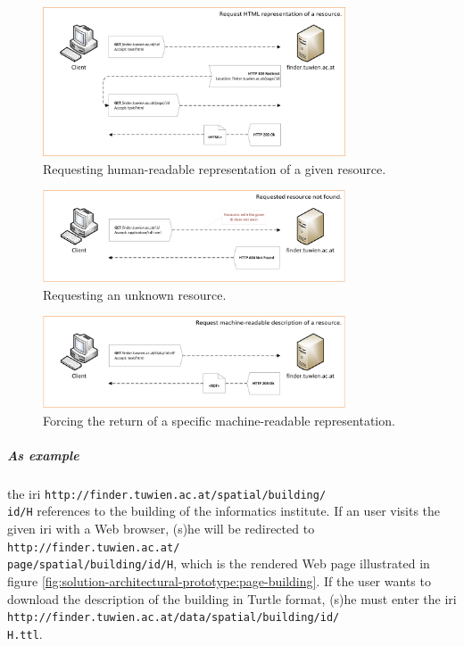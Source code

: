 \documentclass[draft,final]{vutinfth} %
\begin{document}
\begin{figure}[h]
    \centering
    \includegraphics[width=0.8\textwidth]{graphics/solution/uri-strategy/uriStrategyHumanReadable.png}
    \caption{Requesting human-readable representation of a given resource.}
    \label{fig:solution-architectural-prototype:ld-publishing:human-readable}
\end{figure}

\begin{figure}[h]
    \centering
    \includegraphics[width=0.8\textwidth]{graphics/solution/uri-strategy/uriStrategyErrorHandling.png}
    \caption{Requesting an unknown resource.}
    \label{fig:solution-architectural-prototype:ld-publishing:404}
\end{figure}

\begin{figure}[h]
    \centering
    \includegraphics[width=0.8\textwidth]{graphics/solution/uri-strategy/uriStrategyForceMachineReadable.png}
    \caption{Forcing the return of a specific machine-readable representation.}
    \label{fig:solution-architectural-prototype:ld-publishing:force-machine-readable}
\end{figure}

\subparagraph{As example} the \gls{iri} \texttt{http://finder.tuwien.ac.at/spatial/building/\\id/H} references to the building of the informatics institute. If an user visits the given \gls{iri} with a Web browser, (s)he will be redirected to \texttt{http://finder.tuwien.ac.at/\\page/spatial/building/id/H}, which is the rendered Web page illustrated in figure \ref{fig:solution-architectural-prototype:page-building}. If the user wants to download the description of the building in Turtle format, (s)he must enter the \gls{iri} \texttt{http://finder.tuwien.ac.at/data/spatial/building/id/\\H.ttl}.
\end{document}
